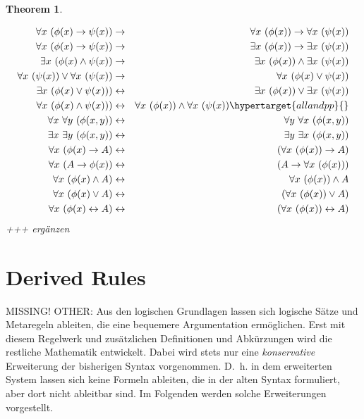 \documentclass[a4paper,german,10pt,twoside]{book}
\newtheorem{thm}{Theorem}[chapter]
\theoremstyle{definition}
\theoremstyle{remark}
\begin{document}
\begin{thm}\hypertarget{elmpred}{}
\begin{eqnarray}
\forall x \ (\phi(x) \rightarrow \psi(x)) & \rightarrow & \forall x \ (\phi(x)) \rightarrow \forall x \ (\psi(x)) \\
\forall x \ (\phi(x) \rightarrow \psi(x)) & \rightarrow & \exists x \ (\phi(x)) \rightarrow \exists x \ (\psi(x)) \\
\exists x \ (\phi(x) \land \psi(x)) & \rightarrow & \exists x \ (\phi(x)) \land \exists x \ (\psi(x)) \\
\forall x \ (\psi(x)) \lor \forall x \ (\psi(x)) & \rightarrow & \forall x \ (\phi(x) \lor \psi(x)) \\
\exists x \ (\phi(x) \lor \psi(x))) & \leftrightarrow & \exists x \ (\phi(x)) \lor \exists x \ (\psi(x)) \\
\forall x \ (\phi(x) \land \psi(x))) & \leftrightarrow & \forall x \ (\phi(x)) \land \forall x \ (\psi(x)) \hypertarget{allandpp}{}\\
\forall x \ \forall y \ (\phi(x, y)) & \leftrightarrow & \forall y \ \forall x \ (\phi(x, y)) \\
\exists x \ \exists y \ (\phi(x, y)) & \leftrightarrow & \exists y \ \exists x \ (\phi(x, y)) \\
\forall x \ (\phi(x) \rightarrow A) & \leftrightarrow & (\forall x \ (\phi(x)) \rightarrow A) \\
\forall x \ (A \rightarrow \phi(x)) & \leftrightarrow & (A \rightarrow \forall x \ (\phi(x))) \\
\forall x \ (\phi(x) \land A) & \leftrightarrow & \forall x \ (\phi(x)) \land A \\
\forall x \ (\phi(x) \lor A) & \leftrightarrow & (\forall x \ (\phi(x)) \lor A) \\
\forall x \ (\phi(x) \leftrightarrow A) & \leftrightarrow & (\forall x \ (\phi(x)) \leftrightarrow A)
\end{eqnarray}
+++ erg{\"a}nzen
\end{thm}

\section{Derived Rules} \label{chapter5_section2} \hypertarget{chapter5_section2}{}
MISSING! OTHER: Aus den logischen Grundlagen lassen sich logische S{\"a}tze und Metaregeln ableiten, die eine bequemere
Argumentation erm{\"o}glichen. Erst mit diesem Regelwerk und zus{\"a}tzlichen Definitionen und Abk{\"u}rzungen
wird die restliche Mathematik entwickelt. Dabei wird stets nur eine
\emph{konservative} Erweiterung der bisherigen Syntax vorgenommen. D.~h. in dem
erweiterten System lassen sich keine Formeln ableiten, die in der alten Syntax formuliert, aber
dort nicht ableitbar sind. Im Folgenden werden solche Erweiterungen vorgestellt.
\end{document}
